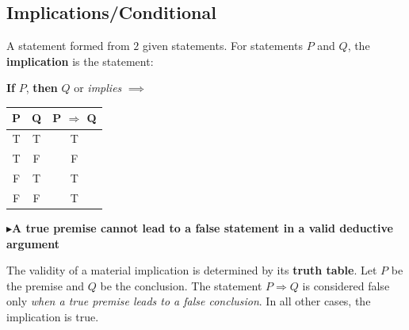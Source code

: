 \documentclass[../Main.tex]{subfiles}
\begin{document}
\subsection{Implications/Conditional}

A statement formed from $2$ given statements. For statements $P$ and $Q$, the \textbf{implication} is the statement:

\textbf{If} $P$, \textbf{then} $Q$ or \textit{implies} $\implies$

\begin{center}

\begin{center}
\begin{tabular}{|c|c|c|}
\hline
\textbf{P} & \textbf{Q} & \textbf{P $\Rightarrow$ Q} \\
\hline
T & T & T \\
\hline
T & F & F \\
\hline
F & T & T \\
\hline
F & F & T \\
\hline
\end{tabular}
\end{center}
\end{center}

$\blacktriangleright $\textbf{A true premise cannot lead to a false statement in a valid deductive argument}

The validity of a material implication is determined by its \textbf{truth table}. Let $P$ be the premise and $Q$ be the conclusion. The statement $P \Rightarrow Q$ is considered false only \textit{when a true premise leads to a false conclusion}. In all other cases, the implication is true.
\end{document}
